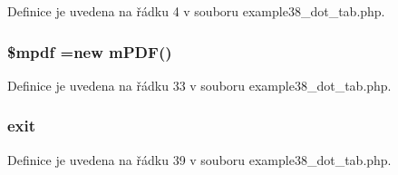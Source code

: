 Definice je uvedena na řádku 4 v souboru example38\-\_\-dot\-\_\-tab.\-php.

\hypertarget{example38__dot__tab_8php_ad028f81910d6cbab9b184d2214b3a8f8}{
\subsubsection[{\$mpdf}]{\setlength{\rightskip}{0pt plus 5cm}\$mpdf =new {\bf m\-P\-D\-F}()}}\label{example38__dot__tab_8php_ad028f81910d6cbab9b184d2214b3a8f8}


Definice je uvedena na řádku 33 v souboru example38\-\_\-dot\-\_\-tab.\-php.

\hypertarget{example38__dot__tab_8php_a6733eb5f605d09eaede9845835d71c4e}{
\subsubsection[{exit}]{\setlength{\rightskip}{0pt plus 5cm}exit}}\label{example38__dot__tab_8php_a6733eb5f605d09eaede9845835d71c4e}


Definice je uvedena na řádku 39 v souboru example38\-\_\-dot\-\_\-tab.\-php.

